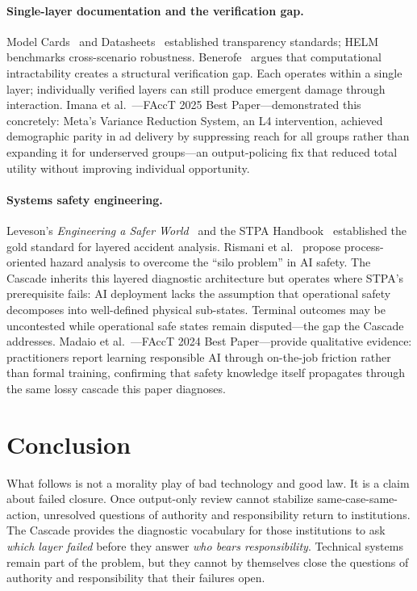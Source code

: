\documentclass[11pt]{article}
\begin{document}
\paragraph{Single-layer documentation and the verification gap.} Model Cards~\cite{mitchell2019model} and Datasheets~\cite{gebru2021datasheets} established transparency standards; HELM~\cite{liang2023holistic} benchmarks cross-scenario robustness. Benerofe~\cite{benerofe2025verification} argues that computational intractability creates a structural verification gap. Each operates within a single layer; individually verified layers can still produce emergent damage through interaction. Imana et al.~\cite{imana2025meta}---FAccT 2025 Best Paper---demonstrated this concretely: Meta's Variance Reduction System, an L4 intervention, achieved demographic parity in ad delivery by suppressing reach for all groups rather than expanding it for underserved groups---an output-policing fix that reduced total utility without improving individual opportunity.

\paragraph{Systems safety engineering.} Leveson's \textit{Engineering a Safer World}~\cite{leveson2012engineering} and the STPA Handbook~\cite{leveson2018stpa} established the gold standard for layered accident analysis. Rismani et al.~\cite{rismani2024silos} propose process-oriented hazard analysis to overcome the ``silo problem'' in AI safety. The Cascade inherits this layered diagnostic architecture but operates where STPA's prerequisite fails: AI deployment lacks the assumption that operational safety decomposes into well-defined physical sub-states. Terminal outcomes may be uncontested while operational safe states remain disputed---the gap the Cascade addresses. Madaio et al.~\cite{madaio2024rai}---FAccT 2024 Best Paper---provide qualitative evidence: practitioners report learning responsible AI through on-the-job friction rather than formal training, confirming that safety knowledge itself propagates through the same lossy cascade this paper diagnoses.

\section{Conclusion}

What follows is not a morality play of bad technology and good law. It is a claim about failed closure. Once output-only review cannot stabilize same-case-same-action, unresolved questions of authority and responsibility return to institutions. The Cascade provides the diagnostic vocabulary for those institutions to ask \textit{which layer failed} before they answer \textit{who bears responsibility}. Technical systems remain part of the problem, but they cannot by themselves close the questions of authority and responsibility that their failures open.
\end{document}
